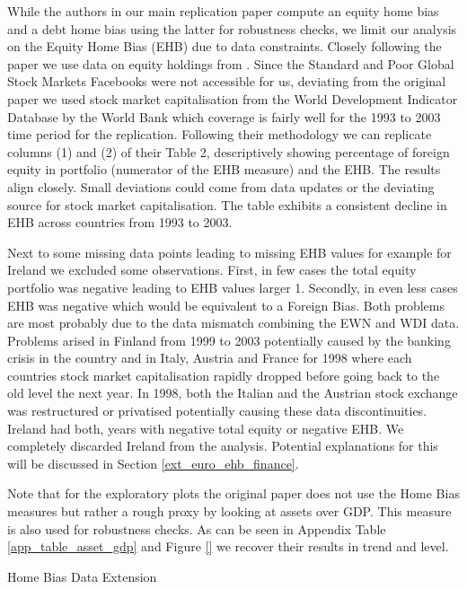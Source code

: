 \documentclass{article}
\begin{document}
While the authors in our main replication paper compute an equity home bias and a debt home bias using the latter for robustness checks, we limit our analysis on the Equity Home Bias (EHB) due to data constraints. Closely following the paper we use data on equity holdings from \textcite{Lane and Milesi-Ferretti (2018), EWN}. Since the Standard and Poor Global Stock Markets Facebooks were not accessible for us, deviating from the original paper we used stock market capitalisation from the World Development Indicator Database by the World Bank which coverage is fairly well for the 1993 to 2003 time period for the replication.
Following their methodology we can replicate columns (1) and (2) of their Table 2, descriptively showing percentage of foreign equity in portfolio (numerator of the EHB measure) and the EHB. The results align closely. Small deviations could come from data updates or the deviating source for stock market capitalisation. The table exhibits a consistent decline in EHB across countries from 1993 to 2003.

Next to some missing data points leading to missing EHB values for example for Ireland we excluded some observations. First, in few cases the total equity portfolio was negative leading to EHB values larger 1. Secondly, in even less cases EHB was negative which would be equivalent to a Foreign Bias. Both problems are most probably due to the data mismatch combining the EWN and WDI data. Problems arised in Finland from 1999 to 2003 potentially caused by the banking crisis in the country \textcite{source} and in Italy, Austria and France for 1998 where each countries stock market capitalisation rapidly dropped before going back to the old level the next year. In 1998, both the Italian and the Austrian stock exchange was restructured or privatised potentially causing these data discontinuities. Ireland had both, years with negative total equity or negative EHB. We completely discarded Ireland from the analysis. Potential explanations for this will be discussed in Section \ref{ext_euro_ehb_finance}. 


Note that for the exploratory plots the original paper does not use the Home Bias measures but rather a rough proxy by looking at assets over GDP. This measure is also used for robustness checks. As can be seen in Appendix Table \ref{app_table_asset_gdp} and Figure \ref{} we recover their results in trend and level.


Home Bias Data Extension
\end{document}
